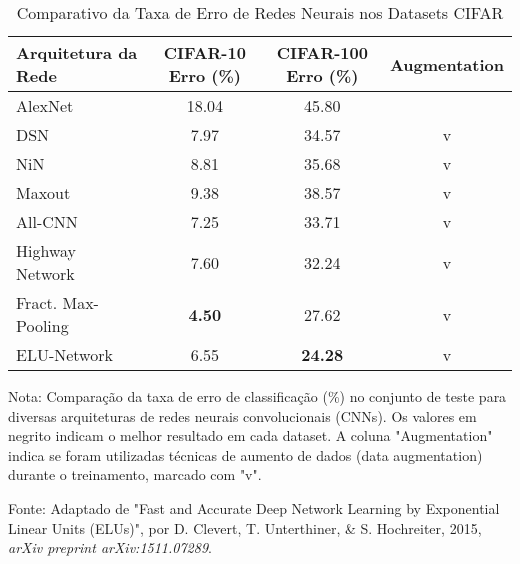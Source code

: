 \begin{table}[ht]
    \centering
    \begin{threeparttable}
        \caption{Comparativo da Taxa de Erro de Redes Neurais nos Datasets CIFAR}
        \label{tab:elu-cifar-comparativo}
        \begin{tabular}{lccc}
            \toprule
            \textbf{Arquitetura da Rede} & \textbf{CIFAR-10 Erro (\%)} & \textbf{CIFAR-100 Erro (\%)} & \textbf{Augmentation} \\
            \midrule
            
            AlexNet              & 18.04          & 45.80          &                \\ 
            \addlinespace
            DSN                  & 7.97           & 34.57          & v              \\
            NiN                  & 8.81           & 35.68          & v              \\
            Maxout               & 9.38           & 38.57          & v              \\
            All-CNN              & 7.25           & 33.71          & v              \\
            Highway Network      & 7.60           & 32.24          & v              \\
            Fract. Max-Pooling   & \textbf{4.50}  & 27.62          & v              \\
            ELU-Network          & 6.55           & \textbf{24.28} & v              \\
            
            \bottomrule
        \end{tabular}
        
        \begin{tablenotes}[para]
            \small
            \item[] Nota: Comparação da taxa de erro de classificação (\%) no conjunto de teste para diversas arquiteturas de redes neurais convolucionais (CNNs). Os valores em negrito indicam o melhor resultado em cada dataset. A coluna "Augmentation" indica se foram utilizadas técnicas de aumento de dados (data augmentation) durante o treinamento, marcado com "v".
            \item[] Fonte: Adaptado de "Fast and Accurate Deep Network Learning by Exponential Linear Units (ELUs)", por D. Clevert, T. Unterthiner, \& S. Hochreiter, 2015, \textit{arXiv preprint arXiv:1511.07289}.
        \end{tablenotes}
        
    \end{threeparttable}
\end{table}

